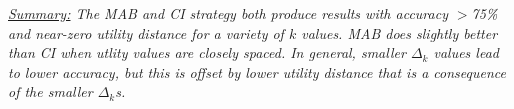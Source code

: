 
 
 

{\em \underline{Summary:} The MAB and CI strategy both produce results with 
accuracy $>$75\% and near-zero utility distance for a variety of $k$ values.
MAB does slightly better than CI when utlity values are closely spaced.
In general, smaller $\Delta_k$ values lead to lower accuracy, but this is offset by
lower utility distance that is a consequence of the smaller $\Delta_k$s. 
}


